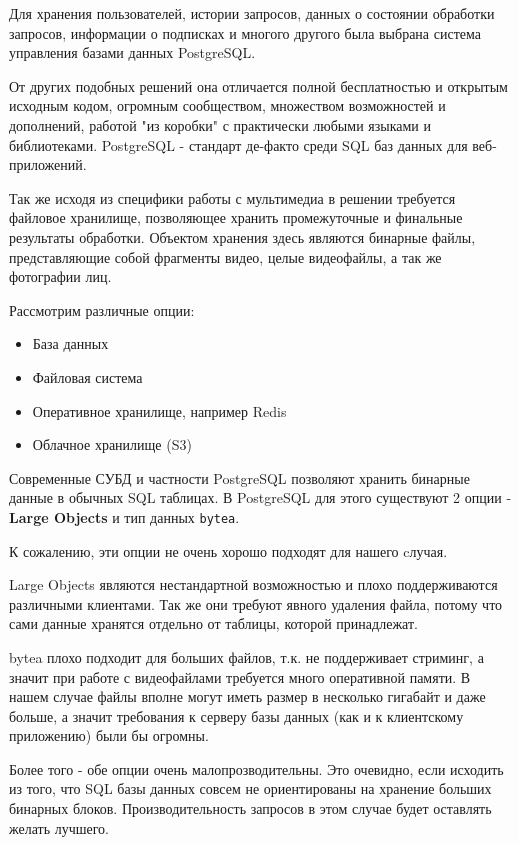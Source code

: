Для хранения пользователей, истории запросов, данных о состоянии обработки запросов, информации о подписках и многого другого была выбрана система управления базами данных PostgreSQL.

От других подобных решений она отличается полной бесплатностью и открытым исходным кодом, огромным сообществом, множеством возможностей и дополнений, работой "из коробки" с практически любыми языками и библиотеками. PostgreSQL - стандарт де-факто среди SQL баз данных для веб-приложений.

Так же исходя из специфики работы с мультимедиа в решении требуется файловое хранилище, позволяющее хранить промежуточные и финальные результаты обработки. Объектом хранения здесь являются бинарные файлы, представляющие собой фрагменты видео, целые видеофайлы, а так же фотографии лиц.

Рассмотрим различные опции:

\begin{itemize}
	\item База данных
	\item Файловая система
	\item Оперативное хранилище, например Redis
	\item Облачное хранилище (S3)
\end{itemize}

Современные СУБД и частности PostgreSQL позволяют хранить бинарные данные в обычных SQL таблицах. В PostgreSQL для этого существуют 2 опции - \textbf{Large Objects} и тип данных \texttt{bytea}.

К сожалению, эти опции не очень хорошо подходят для нашего cлучая.

Large Objects являются нестандартной возможностью и плохо поддерживаются различными клиентами. Так же они требуют явного удаления файла, потому что сами данные хранятся отдельно от таблицы, которой принадлежат.

bytea плохо подходит для больших файлов, т.к. не поддерживает стриминг, а значит при работе с видеофайлами требуется много оперативной памяти. В нашем случае файлы вполне могут иметь размер в несколько гигабайт и даже больше, а значит требования к серверу базы данных (как и к клиентскому приложению) были бы огромны.

Более того - обе опции очень малопрозводительны. Это очевидно, если исходить из того, что SQL базы данных совсем не ориентированы на хранение больших бинарных блоков. Производительность запросов в этом случае будет оставлять желать лучшего.

